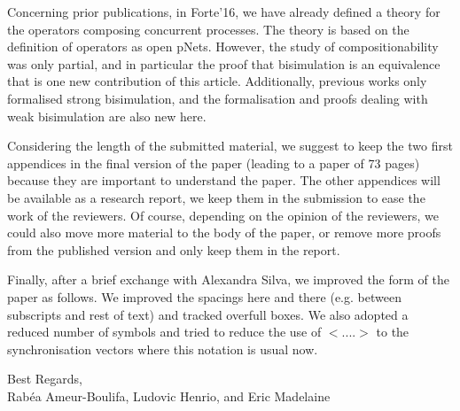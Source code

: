 \documentclass[10pt]{article}
\begin{document}
Concerning prior publications, in Forte'16, we have already defined a theory for the operators composing concurrent processes. The theory is based on the definition of operators as open pNets. However, the study of compositionability was only partial, and in particular the proof that bisimulation is an equivalence that is one new contribution of this article. Additionally, previous works only formalised strong bisimulation, and the formalisation and proofs dealing with weak bisimulation are also new here.




\smallskip

Considering the length of the submitted material,
 we   suggest to
keep the two first appendices in the final version of the paper (leading to a
paper of 73 pages) because they are important to understand the paper.
The other appendices will be available as a research report, we keep
them in the submission to ease the work of the reviewers. 
Of course, depending on the opinion of the reviewers, we could also move more material to  the body of the paper, or remove more proofs from the published version and only keep them in the report.


\smallskip

Finally, after a brief exchange with Alexandra Silva, we improved the form of the paper as follows. We improved the spacings here and there (e.g. between subscripts and rest of text) and tracked overfull boxes. We also adopted a reduced number of symbols and tried to reduce the use of $<....>$ to the synchronisation vectors where this notation is usual now.

\begin{flushright}
  Best Regards,\\
  Rab\'ea Ameur-Boulifa, Ludovic Henrio, and Eric Madelaine
\end{flushright}
\end{document}
